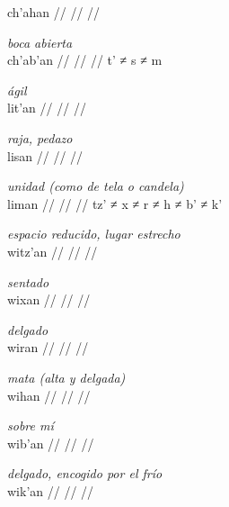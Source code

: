 \documentclass{article}%
\begin{document}
\begingl
\gla ch’ahan //
\glb  //
\glc  //
\endgl
\xe
%
\medskip%
\par\medskip%
\ex
\textit{boca abierta} \\
\begingl
\gla ch’ab’an //
\glb  //
\glc  //
\endgl
\xe
%
\medskip%
t’ ≠ s ≠ m %
\par\medskip%
\ex
\textit{ágil} \\
\begingl
\gla lit’an //
\glb  //
\glc  //
\endgl
\xe
%
\medskip%
\par\medskip%
\ex
\textit{raja, pedazo} \\
\begingl
\gla lisan //
\glb  //
\glc  //
\endgl
\xe
%
\medskip%
\par\medskip%
\ex
\textit{unidad (como de tela o candela)} \\
\begingl
\gla liman //
\glb  //
\glc  //
\endgl
\xe
%
\medskip%
tz’ ≠ x ≠ r ≠ h ≠ b’ ≠ k’ %
\par\medskip%
\ex
\textit{espacio reducido, lugar estrecho} \\
\begingl
\gla witz’an //
\glb  //
\glc  //
\endgl
\xe
%
\medskip%
\par\medskip%
\ex
\textit{sentado} \\
\begingl
\gla wixan //
\glb  //
\glc  //
\endgl
\xe
%
\medskip%
\par\medskip%
\ex
\textit{delgado} \\
\begingl
\gla wiran //
\glb  //
\glc  //
\endgl
\xe
%
\medskip%
\par\medskip%
\ex
\textit{mata (alta y delgada)} \\
\begingl
\gla wihan //
\glb  //
\glc  //
\endgl
\xe
%
\medskip%
\par\medskip%
\ex
\textit{sobre mí} \\
\begingl
\gla wib’an //
\glb  //
\glc  //
\endgl
\xe
%
\medskip%
\par\medskip%
\ex
\textit{delgado, encogido por el frío} \\
\begingl
\gla wik’an //
\glb  //
\glc  //
\endgl
\xe
%
\medskip

%
\end{document}
